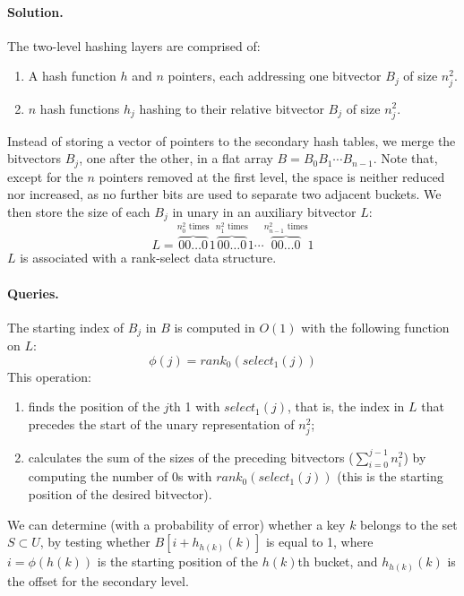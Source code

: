 \paragraph{Solution.} The two-level hashing layers are comprised of:
\begin{enumerate}
  \item A hash function $h$ and $n$ pointers, each addressing one bitvector $B_j$ of size $n_j^2$.
  \item $n$ hash functions $h_j$ hashing to their relative bitvector $B_j$ of size $n_j^2$.
\end{enumerate}
Instead of storing a vector of pointers to the secondary hash tables, we merge the bitvectors $B_j$, one after the other, in a flat array $B=B_0B_1 \cdots B_{n-1}$. Note that, except for the $n$ pointers removed at the first level, the space is neither reduced nor increased, as no further bits are used to separate two adjacent buckets. We then store the size of each $B_j$ in unary in an auxiliary bitvector $L$:
$$L = \overbrace{00 \dots 0}^{n_0^2 \text{ times}} 1 
      \overbrace{00 \dots 0}^{n_1^2 \text{ times}} 1 \cdots
      \overbrace{00 \dots 0}^{n_{n-1}^2 \text{ times}} 1$$
$L$ is associated with a rank-select data structure.

\paragraph{Queries.} The starting index of $B_j$ in $B$ is computed in $O(1)$ with the following function on $L$: $$\phi(j)=rank_0(select_1(j))$$ This operation:
\begin{enumerate}
  \item finds the position of the $j$th 1 with $select_1(j)$, that is, the index in $L$ that precedes the start of the unary representation of $n_j^2$;
  \item calculates the sum of the sizes of the preceding bitvectors ($\sum_{i=0}^{j-1} n_i^2$) by computing the number of $0$s with $rank_0(select_1(j))$ (this is the starting position of the desired bitvector).
\end{enumerate}
We can determine (with a probability of error) whether a key $k$ belongs to the set $S \subset U$, by testing whether $B[i+h_{h(k)}(k)]$ is equal to 1, where $i=\phi(h(k))$ is the starting position of the $h(k)$th bucket, and $h_{h(k)}(k)$ is the offset for the secondary level.

